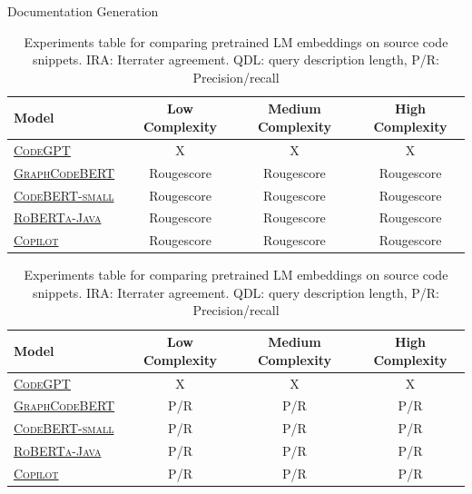 \documentclass[sigconf,review,anonymous]{acmart}
\begin{document}
  Documentation Generation
    {
    \renewcommand{\arraystretch}{1.5}
    \begin{table}[H]
      \footnotesize
      \begin{tabular}{l|ccc}
        Model & Low Complexity & Medium Complexity & High Complexity \\
        \hline
        \href{https://huggingface.co/microsoft/CodeGPT-small-java}{\textsc{CodeGPT}}~\citep{lu2021codexglue} & X & X & X \\
        \href{https://huggingface.co/microsoft/graphcodebert-base}{\textsc{GraphCodeBERT}}~\citep{guo2021graphcodebert} & Rougescore & Rougescore & Rougescore \\
        \href{https://huggingface.co/huggingface/CodeBERTa-small-v1a}{\textsc{CodeBERT-small}}~\citep{feng2020codebert} & Rougescore & Rougescore & Rougescore \\
        \href{https://huggingface.co/dbernsohn/roberta-java}{\textsc{RoBERTa-Java}}~\citep{liu2019roberta} & Rougescore & Rougescore & Rougescore \\
        \href{https://copilot.github.com/}{\textsc{Copilot}}\citep{chen2021evaluating} & Rougescore & Rougescore & Rougescore \\

      \end{tabular}
      \caption{\label{tab:doc_synthesis} Experiments table for comparing pretrained LM embeddings on source code snippets. IRA: Iterrater agreement. QDL: query description length, P/R: Precision/recall}
    \end{table}
  }

    {
    \renewcommand{\arraystretch}{1.5}
    \begin{table}[H]
      \footnotesize
      \begin{tabular}{l|ccc}
        Model & Low Complexity & Medium Complexity & High Complexity \\
        \hline
        \href{https://huggingface.co/microsoft/CodeGPT-small-java}{\textsc{CodeGPT}}~\citep{lu2021codexglue} & X & X & X \\
        \href{https://huggingface.co/microsoft/graphcodebert-base}{\textsc{GraphCodeBERT}}~\citep{guo2021graphcodebert} & P/R & P/R & P/R \\
        \href{https://huggingface.co/huggingface/CodeBERTa-small-v1a}{\textsc{CodeBERT-small}}~\citep{feng2020codebert} & P/R & P/R & P/R \\
        \href{https://huggingface.co/dbernsohn/roberta-java}{\textsc{RoBERTa-Java}}~\citep{liu2019roberta} & P/R & P/R & P/R \\
        \href{https://copilot.github.com/}{\textsc{Copilot}}\citep{chen2021evaluating} & P/R & P/R & P/R \\

      \end{tabular}
      \caption{\label{tab:code_completion} Experiments table for comparing pretrained LM embeddings on source code snippets. IRA: Iterrater agreement. QDL: query description length, P/R: Precision/recall}
    \end{table}
  }
\end{document}
